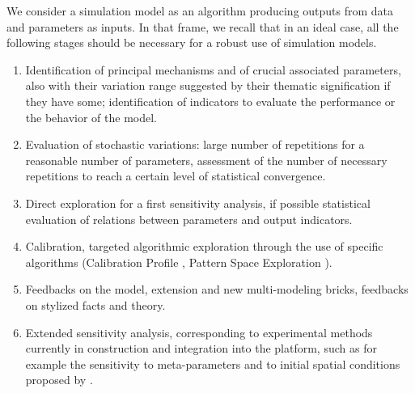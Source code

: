 \documentclass[10pt]{article}
\begin{document}
We consider a simulation model as an algorithm producing outputs from data and parameters as inputs. In that frame, we recall that in an ideal case, all the following stages should be necessary for a robust use of simulation models.

\begin{enumerate}
	\item Identification of principal mechanisms and of crucial associated parameters, also with their variation range suggested by their thematic signification if they have some; identification of indicators to evaluate the performance or the behavior of the model.
	\item Evaluation of stochastic variations: large number of repetitions for a reasonable number of parameters, assessment of the number of necessary repetitions to reach a certain level of statistical convergence.
	\item Direct exploration for a first sensitivity analysis, if possible statistical evaluation of relations between parameters and output indicators.
	\item Calibration, targeted algorithmic exploration through the use of specific algorithms (Calibration Profile \citep{reuillon2015new}, Pattern Space Exploration \citep{}).
	\item Feedbacks on the model, extension and new multi-modeling bricks, feedbacks on stylized facts and theory.
	\item Extended sensitivity analysis, corresponding to experimental methods currently in construction and integration into the platform, such as for example the sensitivity to meta-parameters and to initial spatial conditions proposed by \cite{}.
\end{enumerate}
\end{document}
